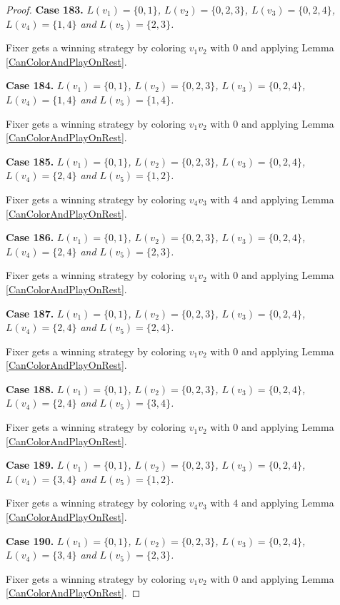 \documentclass[12pt]{amsart}
\theoremstyle{plain}
\theoremstyle{definition}
\theoremstyle{remark}
\begin{document}
\begin{proof}
\noindent\textbf{Case 183.  }\textit{$L(v_1) = \{0, 1\}$, $L(v_2) = \{0, 2, 3\}$, $L(v_3) = \{0, 2, 4\}$, $L(v_4) = \{1, 4\}$ and $L(v_5) = \{2, 3\}$.}

Fixer gets a winning strategy by coloring $v_1v_2$ with $0$ and applying Lemma \ref{CanColorAndPlayOnRest}.

\noindent\textbf{Case 184.  }\textit{$L(v_1) = \{0, 1\}$, $L(v_2) = \{0, 2, 3\}$, $L(v_3) = \{0, 2, 4\}$, $L(v_4) = \{1, 4\}$ and $L(v_5) = \{1, 4\}$.}

Fixer gets a winning strategy by coloring $v_1v_2$ with $0$ and applying Lemma \ref{CanColorAndPlayOnRest}.

\noindent\textbf{Case 185.  }\textit{$L(v_1) = \{0, 1\}$, $L(v_2) = \{0, 2, 3\}$, $L(v_3) = \{0, 2, 4\}$, $L(v_4) = \{2, 4\}$ and $L(v_5) = \{1, 2\}$.}

Fixer gets a winning strategy by coloring $v_4v_3$ with $4$ and applying Lemma \ref{CanColorAndPlayOnRest}.

\noindent\textbf{Case 186.  }\textit{$L(v_1) = \{0, 1\}$, $L(v_2) = \{0, 2, 3\}$, $L(v_3) = \{0, 2, 4\}$, $L(v_4) = \{2, 4\}$ and $L(v_5) = \{2, 3\}$.}

Fixer gets a winning strategy by coloring $v_1v_2$ with $0$ and applying Lemma \ref{CanColorAndPlayOnRest}.

\noindent\textbf{Case 187.  }\textit{$L(v_1) = \{0, 1\}$, $L(v_2) = \{0, 2, 3\}$, $L(v_3) = \{0, 2, 4\}$, $L(v_4) = \{2, 4\}$ and $L(v_5) = \{2, 4\}$.}

Fixer gets a winning strategy by coloring $v_1v_2$ with $0$ and applying Lemma \ref{CanColorAndPlayOnRest}.

\noindent\textbf{Case 188.  }\textit{$L(v_1) = \{0, 1\}$, $L(v_2) = \{0, 2, 3\}$, $L(v_3) = \{0, 2, 4\}$, $L(v_4) = \{2, 4\}$ and $L(v_5) = \{3, 4\}$.}

Fixer gets a winning strategy by coloring $v_1v_2$ with $0$ and applying Lemma \ref{CanColorAndPlayOnRest}.

\noindent\textbf{Case 189.  }\textit{$L(v_1) = \{0, 1\}$, $L(v_2) = \{0, 2, 3\}$, $L(v_3) = \{0, 2, 4\}$, $L(v_4) = \{3, 4\}$ and $L(v_5) = \{1, 2\}$.}

Fixer gets a winning strategy by coloring $v_4v_3$ with $4$ and applying Lemma \ref{CanColorAndPlayOnRest}.

\noindent\textbf{Case 190.  }\textit{$L(v_1) = \{0, 1\}$, $L(v_2) = \{0, 2, 3\}$, $L(v_3) = \{0, 2, 4\}$, $L(v_4) = \{3, 4\}$ and $L(v_5) = \{2, 3\}$.}

Fixer gets a winning strategy by coloring $v_1v_2$ with $0$ and applying Lemma \ref{CanColorAndPlayOnRest}.


\end{proof}
\end{document}
